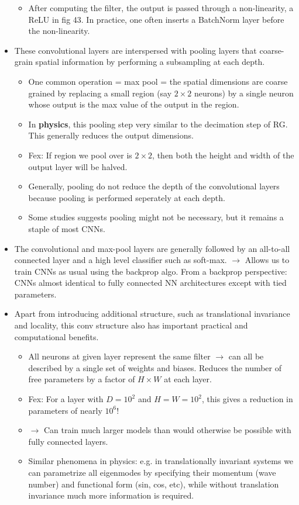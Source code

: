 \documentclass[norsk,a4paper,11pt]{article}
\begin{document}
\begin{itemize}
\begin{itemize}
		\item After computing the filter, the output is passed through a non-linearity, a ReLU in fig 43. In practice, one often inserts a BatchNorm layer before the non-linearity.
	\end{itemize}
	\item These convolutional layers are interspersed with pooling layers that coarse-grain spatial information by performing a subsampling at each depth. 
	\begin{itemize}
		\item One common operation = max pool = the spatial dimensions are coarse grained by replacing a small region (say $2\times 2$ neurons) by a single neuron whose output is the max value of the output in the region. 
		\item In \textbf{physics}, this pooling step very similar to the decimation step of RG. This generally reduces the output dimensions.
		\item Fex: If region we pool over is $2\times 2$, then both the height and width of the output layer will be halved. 
		\item Generally, pooling do not reduce the depth of the convolutional layers because pooling is performed seperately at each depth. 
		\item Some studies suggests pooling might not be necessary, but it remains a staple of most CNNs.
	\end{itemize}
	\item The convolutional and max-pool layers are generally followed by an all-to-all connected layer and a high level classifier such as soft-max. $\rightarrow$ Allows us to train CNNs as usual using the backprop algo. From a backprop perspective: CNNs almost identical to fully connected NN architectures except with tied parameters.
	\item Apart from introducing additional structure, such as translational invariance and locality, this conv structure also has important practical and computational benefits.
	\begin{itemize}
		\item All neurons at given layer represent the same filter $\rightarrow$ can all be described by a single set of weights and biases. Reduces the number of free parameters by a factor of $H\times W$ at each layer.
		\item Fex: For a layer with $D=10^2$ and $H=W=10^2$, this gives a reduction in parameters of nearly $10^6$!
		\item $\rightarrow$ Can train much larger models than would otherwise be possible with fully connected layers.
		\item Similar phenomena in physics: e.g. in translationally invariant systems we can parametrize all eigenmodes by specifying their momentum (wave number) and functional form (sin, cos, etc), while without translation invariance much more information is required.
	\end{itemize}
\end{itemize}
\end{document}

